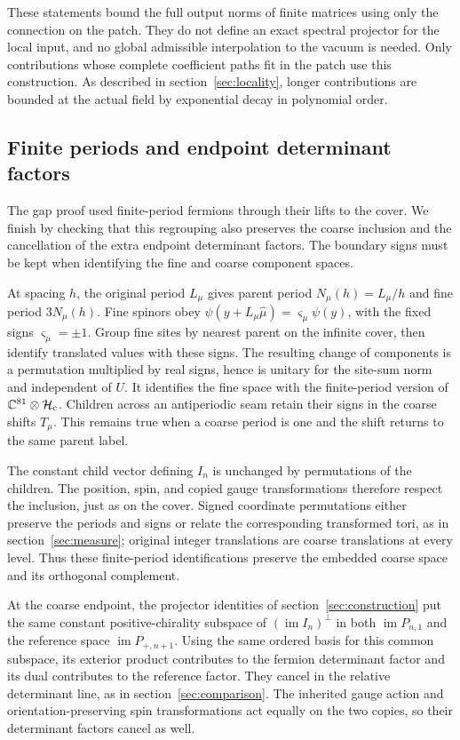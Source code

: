 \documentclass[11pt,a4paper]{article}
\theoremstyle{remark}
\DeclareMathOperator{\im}{im}
\begin{document}
These statements bound the full output norms of finite matrices using
only the connection on the patch. They do not define an exact spectral
projector for the local input, and no global admissible interpolation
to the vacuum is needed. Only contributions whose complete coefficient
paths fit in the patch use this construction. As described in
section~\ref{sec:locality}, longer contributions are bounded at the
actual field by exponential decay in polynomial order.

\subsection{Finite periods and endpoint determinant factors}

The gap proof used finite-period fermions through their lifts to the
cover. We finish by checking that this regrouping also preserves the
coarse inclusion and the cancellation of the extra endpoint determinant
factors. The boundary signs must be kept when identifying the fine and
coarse component spaces.

At spacing $h$, the original period $L_\mu$ gives parent period
$N_\mu(h)=L_\mu/h$ and fine period $3N_\mu(h)$. Fine spinors
obey $\psi(y+L_\mu\hat\mu)=\varsigma_\mu\psi(y)$, with the
fixed signs $\varsigma_\mu=\pm1$. Group fine sites by nearest
parent on the infinite cover, then identify translated values with
these signs. The resulting change of components is a permutation
multiplied by real signs, hence is unitary for the site-sum norm and
independent of $U$. It identifies the fine space with the
finite-period version of $\mathbb C^{81}\otimes\mathcal H_{\rm c}$.
Children across an antiperiodic seam retain their signs in the coarse
shifts $T_\mu$. This remains true when a coarse period is one and
the shift returns to the same parent label.

The constant child vector defining $I_n$ is unchanged by permutations
of the children. The position, spin, and copied gauge transformations
therefore respect the inclusion, just as on the cover. Signed coordinate permutations
either preserve the periods and signs or relate the corresponding
transformed tori, as in section~\ref{sec:measure}; original integer
translations are coarse translations at every level. Thus these
finite-period identifications preserve the embedded coarse space and
its orthogonal complement.

At the coarse endpoint, the projector identities of
section~\ref{sec:construction} put the same constant
positive-chirality subspace of $(\im I_n)^\perp$ in both
$\im P_{n,1}$ and the reference space $\im P_{+,n+1}$.
Using the same ordered basis for this common subspace, its exterior
product contributes to the fermion determinant factor and its dual
contributes to the reference factor. They cancel in the relative
determinant line, as in section~\ref{sec:comparison}. The inherited
gauge action and orientation-preserving spin transformations act equally
on the two copies, so their determinant factors cancel as well.
\end{document}
